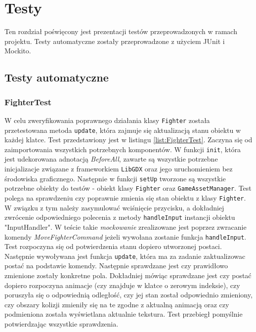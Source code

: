 \chapter{Testy}
Ten rozdział poświęcony jest prezentacji testów przeprowadzonych w ramach projektu. Testy automatyczne zostały przeprowadzone z użyciem JUnit i Mockito.

\section{Testy automatyczne}
\subsection{FighterTest}
W celu zweryfikowania poprawnego działania klasy \texttt{Fighter} została przetestowana metoda \texttt{update}, która zajmuje się aktualizacją stanu obiektu w każdej klatce. Test przedstawiony jest w listingu \ref{list:FighterTest}. Zaczyna się od zaimportowania wszystkich potrzebnych komponentów. W funkcji \texttt{init}, która jest udekorowana adnotacją \emph{BeforeAll}, zawarte są wszystkie potrzebne inicjalizacje związane z frameworkiem \texttt{LibGDX} oraz jego uruchomieniem bez środowiska graficznego. Następnie w funkcji \texttt{setUp} tworzone są wszystkie potrzebne obiekty do testów - obiekt klasy \texttt{Fighter} oraz \texttt{GameAssetManager}. Test polega na sprawdzeniu czy poprawnie zmienia się stan obiektu z klasy \texttt{Fighter}. W związku z tym należy zasymulować wciśnięcie przycisku, a dokładniej zwrócenie odpowiedniego polecenia z metody \texttt{handleInput} instancji obiektu "InputHandler". W teście takie \emph{mockowanie} zrealizowane jest poprzez zwracanie komendy \emph{MoveFighterCommand} jeżeli wywołana zostanie funkcja \texttt{handleInput}.
Test rozpoczyna się od potwierdzenia stanu dopiero utworzonej postaci. Następnie wywoływana jest funkcja \texttt{update}, która ma za zadanie zaktualizowac postać na podstawie komendy. Następnie sprawdzane jest czy prawidłowo zmienione zostały konkretne pola. Dokładniej mówiąc sprawdzane jest czy postać dopiero rozpoczyna animacje (czy znajduje w klatce o zerowym indeksie), czy poruszyła się o odpowiednią odległość, czy jej stan został odpowiednio zmieniony, czy obszary kolizji zmieniły się na te zgodne z aktualną animacją oraz czy podmieniona została wyświetlana aktualnie tekstura. Test przebiegł pomyślnie potwierdzając wszystkie sprawdzenia.
